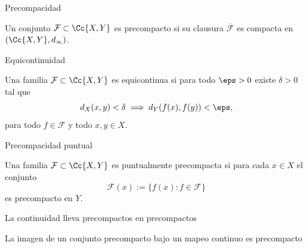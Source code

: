 \begin{frame}{Precompacidad}
    \begin{definicion}
        Un conjunto $\mathcal F\subset \Cc{X,Y}$ es \alert{precompacto} si su clausura $\overline{\mathcal F}$ es compacta en $(\Cc{X,Y},d_{\infty})$.
    \end{definicion}
\end{frame}


\begin{frame}{Equicontinuidad}
    \begin{definicion}
        Una familia $\mathcal F \subset \Cc{X,Y}$ es \alert{equicontinua} si para todo $\eps>0$
        existe $\delta>0$ tal que
        \[
            d_X(x,y)<\delta \implies d_Y(f(x), f(y))<\eps,
        \]
        para todo $f\in\mathcal F$ y todo $x,y\in X$.
    \end{definicion}
\end{frame}

\begin{frame}{Precompacidad puntual}
    \begin{definicion}
        Una familia $\mathcal F \subset \Cc{X,Y}$ es \alert{puntualmente precompacta} si para cada $x\in X$ el conjunto
        \[
            \mathcal F(x) := \{f(x) : f\in\mathcal F\}
        \]
        es precompacto en $Y$.
    \end{definicion}
\end{frame}

\begin{frame}{La continuidad lleva precompactos en precompactos}
    \begin{teorema}
        La imagen de un conjunto precompacto bajo un mapeo continuo es precompacto
    \end{teorema}
\end{frame}


